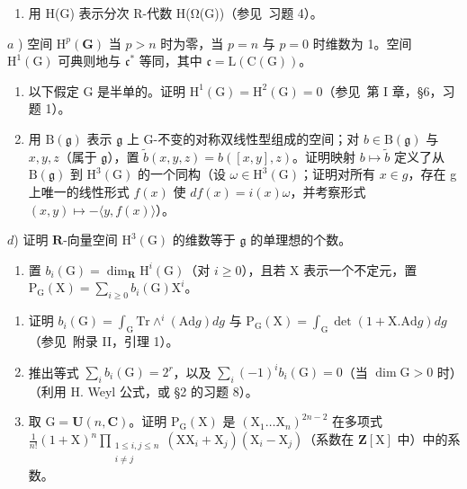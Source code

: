\begin{enumerate}
\begin{enumerate}
\def\labelenumi{\arabic{enumi})}
\setcounter{enumi}{4}
\tightlist
\item
  用 H(G) 表示分次 R-代数 H(Ω(G))（参见~习题 4）。
\end{enumerate}

\(a\) ) 空间 \(\mathrm{H}^p (\mathbf{G})\) 当 \(p > n\) 时为零，当 \(p = n\) 与 \(p = 0\) 时维数为 1。空间 \(\mathrm{H}^1 (\mathrm{G})\) 可典则地与 \(\mathfrak{c}^*\) 等同，其中 \(\mathfrak{c} = \mathrm{L}(\mathrm{C}(\mathrm{G}))\)。

\begin{enumerate}
\def\labelenumi{\alph{enumi})}
\setcounter{enumi}{1}
\item
  以下假定 G 是半单的。证明 \(\mathrm{H}^{1}(\mathrm{G})=\mathrm{H}^{2}(\mathrm{G})=0\)（参见~第 I 章，§6，习题 1）。
\item
  用 \(\mathrm{B}(\mathfrak{g})\) 表示 \(\mathfrak{g}\) 上 G-不变的对称双线性型组成的空间；对 \(b \in \mathrm{B}(\mathfrak{g})\) 与 \(x, y, z\)（属于 \(\mathfrak{g}\)），置 \(\tilde{b}(x, y, z) = b([x, y], z)\)。证明映射 \(b \mapsto \tilde{b}\) 定义了从 \(\mathrm{B}(\mathfrak{g})\) 到 \(\mathrm{H}^{3}(\mathrm{G})\) 的一个同构（设 \(\omega\in\mathrm{H}^{3}(\mathrm{G})\)；证明对所有 \(x\in g\)，存在 g 上唯一的线性形式 \(f(x)\) 使 \(df(x)=i(x)\omega\)，并考察形式 \((x,y)\mapsto-\langle y,f(x)\rangle\)）。
\end{enumerate}

\(d\)) 证明 \(\mathbf{R}\)-向量空间 \(\mathrm{H}^3 (\mathrm{G})\) 的维数等于 \(\mathfrak{g}\) 的单理想的个数。

\begin{enumerate}
\def\labelenumi{\arabic{enumi})}
\setcounter{enumi}{5}
\tightlist
\item
  置 \(b_{i}(\mathrm{G}) = \dim_{\mathbf{R}} \mathrm{H}^{i}(\mathrm{G})\)（对 \(i \geq 0\)），且若 \(\mathrm{X}\) 表示一个不定元，置 \(\mathrm{P}_{\mathrm{G}}(\mathrm{X}) = \sum_{i \geq 0} b_{i}(\mathrm{G}) \mathrm{X}^{i}\)。
\end{enumerate}

\begin{enumerate}
\def\labelenumi{\alph{enumi})}
\item
  证明 \(b_{i}(\mathrm{G}) = \int_{\mathrm{G}} \mathrm{Tr} \wedge^{i} (\mathrm{Ad} g) dg\) 与 \(\mathrm{P}_{\mathrm{G}}(\mathrm{X}) = \int_{\mathrm{G}} \det(1 + \mathrm{X}. \mathrm{Ad} g) dg\)（参见~附录 II，引理 1）。
\item
  推出等式 \(\sum_{i} b_{i}(\mathrm{G}) = 2^{r}\)，以及 \(\sum_{i} (-1)^{i} b_{i}(\mathrm{G}) = 0\)（当 \(\dim \mathrm{G} > 0\) 时）（利用 H. Weyl 公式，或 §2 的习题 8）。
\item
  取 \(\mathrm{G} = \mathbf{U}(n, \mathbf{C})\)。证明 \(\mathrm{P}_{\mathrm{G}}(\mathrm{X})\) 是 \((\mathrm{X}_1 \ldots \mathrm{X}_n)^{2n-2}\) 在多项式 \(\frac{1}{n!}(1 + \mathrm{X})^n \prod_{\substack{1 \leq i, j \leq n \\ i \neq j}} (\mathrm{XX}_i + \mathrm{X}_j)(\mathrm{X}_i - \mathrm{X}_j)\)（系数在 \(\mathbf{Z}[\mathrm{X}]\) 中）中的系数。
\end{enumerate}


\end{enumerate}
